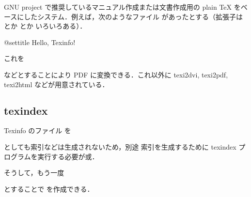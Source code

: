 GNU project で推奨しているマニュアル作成または文書作成用の 
plain TeX をベースにしたシステム．例えば，次のようなファイル 
 があったとする（拡張子は とか とか
いろいろある）．
\begin{InText}
 \def\lang{jp}
 
 @settitle Hello, Texinfo!
 \bye
\end{InText}
これを
\begin{InTerm}
\end{InTerm}
などとすることにより PDF に変換できる．これ以外に
 texi2dvi, texi2pdf, texi2html などが用意されている．


\subsection{texindex}

Texinfo のファイル  を
\begin{InTerm}
\end{InTerm}
としても索引などは生成されないため，別途 索引を生成するために texindex
プログラムを実行する必要が或．
\begin{InTerm}
\end{InTerm}
そうして，もう一度
\begin{InTerm}
\end{InTerm}
とすることで  を作成できる．

